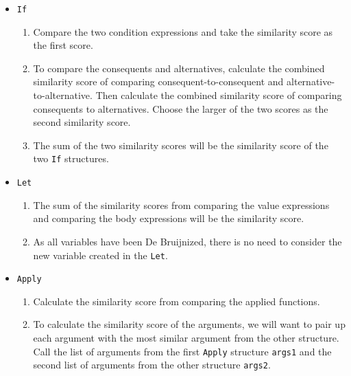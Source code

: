 \documentclass[12pt]{article}
\newcommand{\key}[1]{\texttt{#1}}
\begin{document}
\begin{itemize}
  \item\key{If}
    \begin{adjustwidth}{5mm}{}
      \begin{enumerate}
        \item Compare the two condition expressions and take the similarity score as the first score.

        \item To compare the consequents and alternatives, calculate the combined similarity score of comparing consequent-to-consequent and alternative-to-alternative. Then calculate the combined similarity score of comparing consequents to alternatives. Choose the larger of the two scores as the second similarity score.

        \item The sum of the two similarity scores will be the similarity score of the two \key{If} structures.
  \end{enumerate}
    \end{adjustwidth}

  \item\key{Let}
    \begin{adjustwidth}{5mm}{}
      \begin{enumerate}
\item     The sum of the similarity scores from comparing the value expressions and comparing the body expressions will be the similarity score.

\item     As all variables have been De Bruijnized, there is no need to consider the new variable created in the \key{Let}.
  \end{enumerate}
    \end{adjustwidth}

  \item\key{Apply}
    \begin{adjustwidth}{5mm}{}
      \begin{enumerate}
\item     Calculate the similarity score from comparing the applied functions.

\item     To calculate the similarity score of the arguments, we will want to pair up each argument with the most similar argument from the other structure. Call the list of arguments from the first \key{Apply} structure \key{args1} and the second list of arguments from the other structure \key{args2}.


\end{enumerate}
\end{adjustwidth}
\end{itemize}
\end{document}
